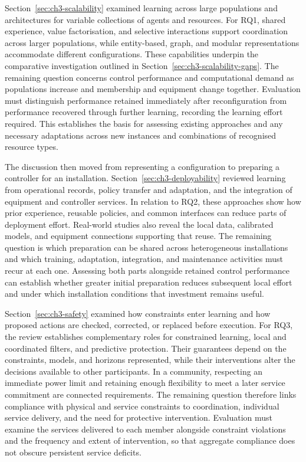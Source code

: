 Section~\ref{sec:ch3-scalability} examined learning across large populations and architectures for variable collections of agents and resources. For RQ1, shared experience, value factorisation, and selective interactions support coordination across larger populations, while entity-based, graph, and modular representations accommodate different configurations. These capabilities underpin the comparative investigation outlined in Section~\ref{sec:ch3-scalability-gaps}. The remaining question concerns control performance and computational demand as populations increase and membership and equipment change together. Evaluation must distinguish performance retained immediately after reconfiguration from performance recovered through further learning, recording the learning effort required. This establishes the basis for assessing existing approaches and any necessary adaptations across new instances and combinations of recognised resource types.

The discussion then moved from representing a configuration to preparing a controller for an installation. Section~\ref{sec:ch3-deployability} reviewed learning from operational records, policy transfer and adaptation, and the integration of equipment and controller services. In relation to RQ2, these approaches show how prior experience, reusable policies, and common interfaces can reduce parts of deployment effort. Real-world studies also reveal the local data, calibrated models, and equipment connections supporting that reuse. The remaining question is which preparation can be shared across heterogeneous installations and which training, adaptation, integration, and maintenance activities must recur at each one. Assessing both parts alongside retained control performance can establish whether greater initial preparation reduces subsequent local effort and under which installation conditions that investment remains useful.

Section~\ref{sec:ch3-safety} examined how constraints enter learning and how proposed actions are checked, corrected, or replaced before execution. For RQ3, the review establishes complementary roles for constrained learning, local and coordinated filters, and predictive protection. Their guarantees depend on the constraints, models, and horizons represented, while their interventions alter the decisions available to other participants. In a community, respecting an immediate power limit and retaining enough flexibility to meet a later service commitment are connected requirements. The remaining question therefore links compliance with physical and service constraints to coordination, individual service delivery, and the need for protective intervention. Evaluation must examine the services delivered to each member alongside constraint violations and the frequency and extent of intervention, so that aggregate compliance does not obscure persistent service deficits.

